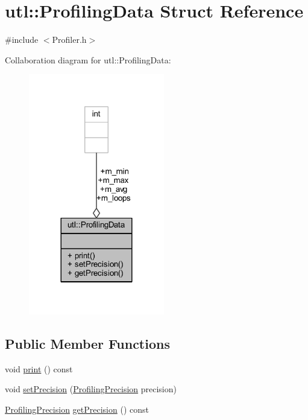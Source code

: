 \hypertarget{structutl_1_1_profiling_data}{}\section{utl\+:\+:Profiling\+Data Struct Reference}
\label{structutl_1_1_profiling_data}


{\ttfamily \#include $<$Profiler.\+h$>$}



Collaboration diagram for utl\+:\+:Profiling\+Data\+:\nopagebreak
\begin{figure}[H]
\begin{center}
\leavevmode
\includegraphics[width=168pt]{structutl_1_1_profiling_data__coll__graph}
\end{center}
\end{figure}
\subsection*{Public Member Functions}
\begin{DoxyCompactItemize}
\item 
void \mbox{\hyperlink{structutl_1_1_profiling_data_abf6ff992cd66ef1ad903afc3d3057d2e}{print}} () const
\item 
void \mbox{\hyperlink{structutl_1_1_profiling_data_a56c49476d775e0c82d5718f609680a5e}{set\+Precision}} (\mbox{\hyperlink{namespaceutl_ad221bb3fac593651670bdc0263b92707}{Profiling\+Precision}} precision)
\item 
\mbox{\hyperlink{namespaceutl_ad221bb3fac593651670bdc0263b92707}{Profiling\+Precision}} \mbox{\hyperlink{structutl_1_1_profiling_data_a81bcb78d3bb5fdb2ef0e100e44fed249}{get\+Precision}} () const
\end{DoxyCompactItemize}
